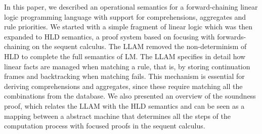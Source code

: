 In this paper, we described an operational semantics for a forward-chaining
linear logic programming language with support for comprehensions, aggregates
and rule priorities. We started with a simple fragment of linear logic which was
then expanded to HLD semantics, a proof system based on focusing with
forwards-chaining on the sequent calculus. The LLAM removed the non-determinism
of HLD to complete the full semantics of LM. The LLAM specifies in detail how
linear facts are managed when matching a rule, that is, by storing continuation
frames and backtracking when matching fails. This mechanism is essential for
deriving comprehensions and aggregates, since these require matching all the
combinations from the database. We also presented an overview of the soundness
proof, which relates the LLAM with the HLD semantics and can be seen as a
mapping between a abstract machine that determines all the steps of the
computation process with focused proofs in the sequent calculus.
